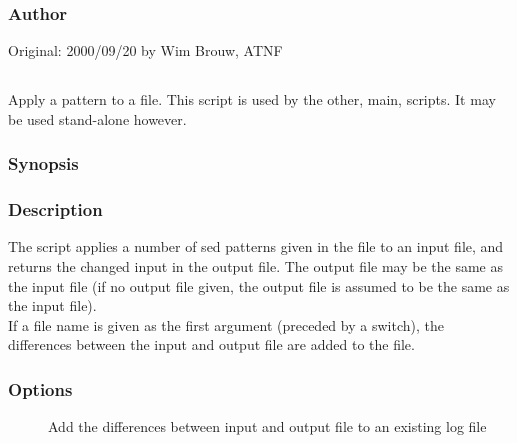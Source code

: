 \subsubsection*{Author}

Original: 2000/09/20 by Wim Brouw, ATNF


\newpage

\subsection{}
\label{UPsed}

Apply a  pattern to a file. This script is used  by the other, main,
 scripts. It may be used stand-alone however.

\subsubsection*{Synopsis}

\begin{synopsis}
\end{synopsis}

\subsubsection*{Description}

\noindent
The  script applies a number of sed patterns given in the
 file to an input file, and returns the changed input in the output
file. The output file may be the same as the input file (if no output file
given, the output file is assumed to be the same as the input file).\\
If a  file name is given as the first argument (preceded by a
 switch), the differences between the input and output file are added
to the  file.

\subsubsection*{Options}

\begin{description}
\item[]
    Add the differences between input and output file to an existing log file
\end{description}

